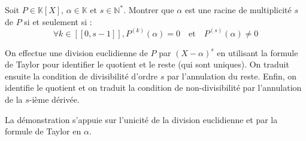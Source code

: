 \documentclass[11pt, a4paper]{article}
\theoremstyle{definition}
\begin{document}
\clearpage

\begin{tcolorbox}[instructionstyle]
Soit $P \in \mathbb{K}[X]$, $\alpha \in \mathbb{K}$ et $s \in \mathbb{N}^*$. Montrer que $\alpha$ est une racine de multiplicité $s$ de $P$ si et seulement si :
\[
\forall k \in [\![0, s-1]\!], P^{(k)}(\alpha) = 0 \quad \text{et} \quad P^{(s)}(\alpha) \neq 0
\]
\end{tcolorbox}

\begin{tcolorbox}[methodstyle]
  On effectue une division euclidienne de $P$ par $(X-\alpha)^s$ en utilisant la formule de Taylor pour identifier le quotient et le reste (qui sont uniques). On traduit ensuite la condition de divisibilité d'ordre $s$ par l'annulation du reste. Enfin, on identifie le quotient et on traduit la condition de non-divisibilité par l'annulation de la $s$-ième dérivée.
\end{tcolorbox}

La démonstration s'appuie sur l'unicité de la division euclidienne et par la formule de Taylor en $\alpha$.
\end{document}
